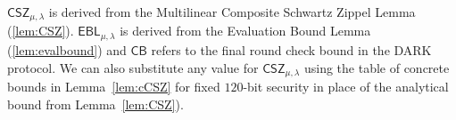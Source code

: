 \def\thetheorem{\ref{thm:darkisdarkss}}
\begin{theorem}
\maintheorem
\end{theorem}

\begin{remark} $\mathsf{CSZ}_{\mu, \lambda}$ is derived from the Multilinear Composite Schwartz Zippel Lemma (\cref{lem:CSZ}). $\mathsf{EBL}_{\mu, \lambda}$ is derived from the Evaluation Bound Lemma (\cref{lem:evalbound}) and $\mathsf{CB}$ refers to the final round check bound in the DARK protocol. We can also substitute any value for $\mathsf{CSZ}_{\mu,\lambda}$ using the table of concrete bounds in Lemma~\ref{lem:cCSZ} for fixed $120$-bit security in place of the analytical bound from Lemma~\ref{lem:CSZ}).%
\end{remark}



